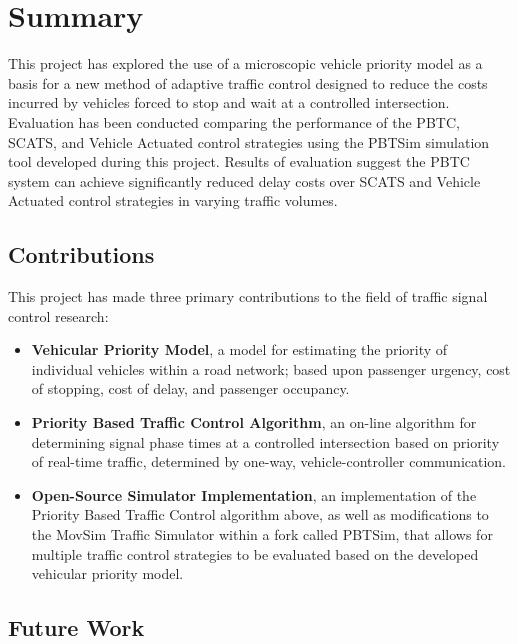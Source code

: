\chapter{Summary}

This project has explored the use of a microscopic vehicle priority model as a basis for a new method of adaptive traffic control designed to reduce the costs incurred by vehicles forced to stop and wait at a controlled intersection. Evaluation has been conducted comparing the performance of the PBTC, SCATS, and Vehicle Actuated control strategies using the PBTSim simulation tool developed during this project. Results of evaluation suggest the PBTC system can achieve significantly reduced delay costs over SCATS and Vehicle Actuated control strategies in varying traffic volumes.


\section{Contributions}

This project has made three primary contributions to the field of traffic signal control research:

\begin{itemize}
\item \textbf{Vehicular Priority Model}, a model for estimating the priority of individual vehicles within a road network; based upon passenger urgency, cost of stopping, cost of delay, and passenger occupancy.
\item \textbf{Priority Based Traffic Control Algorithm}, an on-line algorithm for determining signal phase times at a controlled intersection based on priority of real-time traffic, determined by one-way, vehicle-controller communication. 
\item \textbf{Open-Source Simulator Implementation}, an implementation of the Priority Based Traffic Control algorithm above, as well as modifications to the MovSim Traffic Simulator within a fork called PBTSim, that allows for multiple traffic control strategies to be evaluated based on the developed vehicular priority model.
\end{itemize}
 
\section{Future Work}

